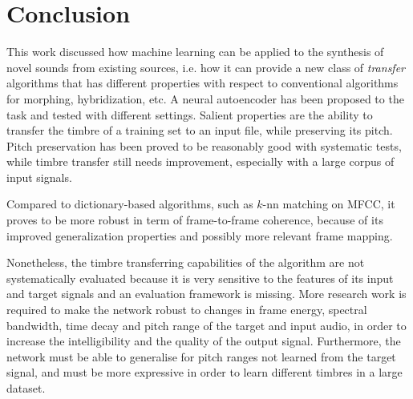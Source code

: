 \section{Conclusion}

This work discussed how machine learning can be applied to the synthesis of novel sounds from existing sources, i.e. how it can provide a new class of \textit{transfer} algorithms that has different properties with respect to conventional algorithms for morphing, hybridization, etc. A neural autoencoder has been proposed to the task and tested with different settings. Salient properties are the ability to transfer the timbre of a training set to an input file, while preserving its pitch. Pitch preservation has been proved to be reasonably good with systematic tests, while timbre transfer still needs improvement, especially with a large corpus of input signals.

Compared to dictionary-based algorithms, such as $k$-nn matching on MFCC, it proves to be more robust in term of frame-to-frame coherence, because of its improved generalization properties and possibly more relevant frame mapping.

Nonetheless, the timbre transferring capabilities of the algorithm are not systematically evaluated because it is very sensitive to the features of its input and target signals and an evaluation framework is missing. More research work is required to make the network robust to changes in frame energy, spectral bandwidth, time decay and pitch range of the target and input audio, in order to increase the intelligibility and the quality of the output signal. Furthermore, the network must be able to generalise for pitch ranges not learned from the target signal, and must be more expressive in order to learn different timbres in a large dataset. 

